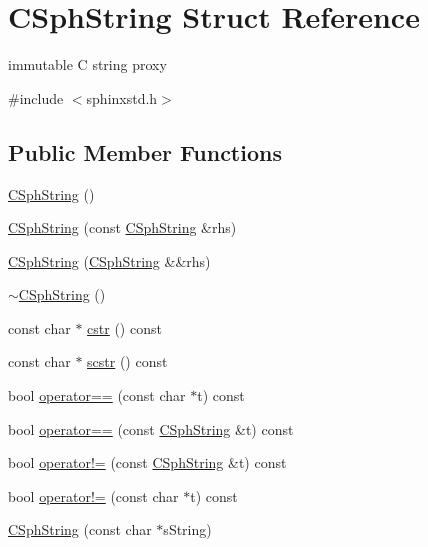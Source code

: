 \hypertarget{structCSphString}{\section{C\-Sph\-String Struct Reference}
\label{structCSphString}
}


immutable C string proxy  




{\ttfamily \#include $<$sphinxstd.\-h$>$}

\subsection*{Public Member Functions}
\begin{DoxyCompactItemize}
\item 
\hyperlink{structCSphString_a1d14a9116a2213020b6e8527a392f4b0}{C\-Sph\-String} ()
\item 
\hyperlink{structCSphString_a095ae8d119bff9f30c5446b8632f4c71}{C\-Sph\-String} (const \hyperlink{structCSphString}{C\-Sph\-String} \&rhs)
\item 
\hyperlink{structCSphString_a55d80fc8d1d2d557744920ce8b680dbb}{C\-Sph\-String} (\hyperlink{structCSphString}{C\-Sph\-String} \&\&rhs)
\item 
\hyperlink{structCSphString_a79e769fc4a3d12e170590ba6910cf3df}{$\sim$\-C\-Sph\-String} ()
\item 
const char $\ast$ \hyperlink{structCSphString_a6301bc267fc3578e8f6cde7490a177a0}{cstr} () const 
\item 
const char $\ast$ \hyperlink{structCSphString_a7f35b6bda71ff79f03bcec528b3c6674}{scstr} () const 
\item 
bool \hyperlink{structCSphString_a2c7e37a5400d37a5527c163309ada9f9}{operator==} (const char $\ast$t) const 
\item 
bool \hyperlink{structCSphString_acd995abf650ad2e3678c63721eb78e0c}{operator==} (const \hyperlink{structCSphString}{C\-Sph\-String} \&t) const 
\item 
bool \hyperlink{structCSphString_a0ed78b9aae9949154718f9af158cf210}{operator!=} (const \hyperlink{structCSphString}{C\-Sph\-String} \&t) const 
\item 
bool \hyperlink{structCSphString_a978c4893931a1a1aac3ea74b7c373d60}{operator!=} (const char $\ast$t) const 
\item 
\hyperlink{structCSphString_a054199e2453c38510f6b253787df0d5c}{C\-Sph\-String} (const char $\ast$s\-String)
\item 

\end{DoxyCompactItemize}
